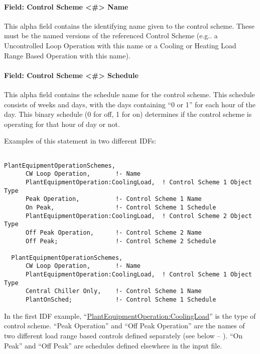 \paragraph{Field: Control Scheme \textless{}\#\textgreater{} Name}\label{field-control-scheme-name}

This alpha field contains the identifying name given to the control scheme. These must be the named versions of the referenced Control Scheme (e.g.. a Uncontrolled Loop Operation with this name or a Cooling or Heating Load Range Based Operation with this name).

\paragraph{Field: Control Scheme \textless{}\#\textgreater{} Schedule}\label{field-control-scheme-schedule}

This alpha field contains the schedule name for the control scheme. This schedule consists of weeks and days, with the days containing ``0 or 1'' for each hour of the day. This binary schedule (0 for off, 1 for on) determines if the control scheme is operating for that hour of day or not.

Examples of this statement in two different IDFs:

\begin{lstlisting}

PlantEquipmentOperationSchemes,
      CW Loop Operation,       !- Name
      PlantEquipmentOperation:CoolingLoad,  ! Control Scheme 1 Object Type
      Peak Operation,          !- Control Scheme 1 Name
      On Peak,                 !- Control Scheme 1 Schedule
      PlantEquipmentOperation:CoolingLoad,  ! Control Scheme 2 Object Type
      Off Peak Operation,      !- Control Scheme 2 Name
      Off Peak;                !- Control Scheme 2 Schedule

  PlantEquipmentOperationSchemes,
      CW Loop Operation,       !- Name
      PlantEquipmentOperation:CoolingLoad,  ! Control Scheme 1 Object Type
      Central Chiller Only,    !- Control Scheme 1 Name
      PlantOnSched;            !- Control Scheme 1 Schedule
\end{lstlisting}

In the first IDF example, ``\hyperref[plantequipmentoperationcoolingload]{PlantEquipmentOperation:CoolingLoad}'' is the type of control scheme. ``Peak Operation'' and ``Off Peak Operation'' are the names of two different load range based controls defined separately (see below -- ). ``On Peak'' and ``Off Peak'' are schedules defined elsewhere in the input file.

